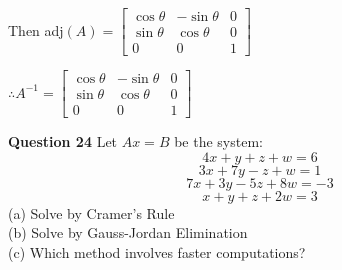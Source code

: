 \documentclass[addpoints]{exam}
\begin{document}
\begin{sloppypar}
\begin{questions}
\begin{solution}
        Then adj$ (A) = \begin{bmatrix}
            \cos\theta & -\sin\theta & 0 \\ \sin\theta & \cos\theta & 0 \\ 0 & 0 & 1
        \end{bmatrix} $

        $ \therefore A^{-1} = \begin{bmatrix}
            \cos\theta & -\sin\theta & 0 \\ \sin\theta & \cos\theta & 0 \\ 0 & 0 & 1
        \end{bmatrix} $
    \end{solution}

    \question
    \textbf{Question 24} Let $ Ax = B $ be the system: $$ 4x + y + z + w = 6 $$ $$ 3x + 7y -z + w = 1 $$ $$ 7x + 3y -5z + 8w = -3 $$ $$ x + y + z + 2w = 3 $$
    (a) Solve by Cramer's Rule \\ (b) Solve by Gauss-Jordan Elimination \\ (c) Which method involves faster computations?
    \begin{solution}
\end{solution}
\end{questions}
\end{sloppypar}
\end{document}
